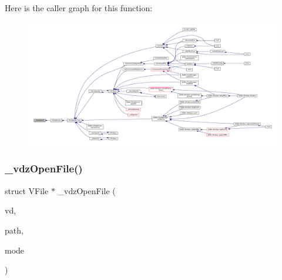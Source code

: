 Here is the caller graph for this function\+:
\nopagebreak
\begin{figure}[H]
\begin{center}
\leavevmode
\includegraphics[width=350pt]{vfs-zip_8c_a69eab4c663a9a5f03f615134ef62db34_icgraph}
\end{center}
\end{figure}
\mbox{\label{vfs-zip_8c_ac2b71e2008abddb2b5a74914eb8fe458}} 
\subsubsection{\texorpdfstring{\+\_\+vdz\+Open\+File()}{\_vdzOpenFile()}}
{\footnotesize\ttfamily struct V\+File $\ast$ \+\_\+vdz\+Open\+File (\begin{DoxyParamCaption}\item[{struct V\+Dir $\ast$}]{vd,  }\item[{const char $\ast$}]{path,  }\item[{\mbox{\hyperlink{ioapi_8h_a787fa3cf048117ba7123753c1e74fcd6}{int}}}]{mode }\end{DoxyParamCaption})\hspace{0.3cm}{\ttfamily [static]}}


